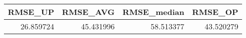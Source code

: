 \begin{tabular}{rrrr}
\toprule
  RMSE\_UP &  RMSE\_AVG &  RMSE\_median &   RMSE\_OP \\
\midrule
26.859724 & 45.431996 &    58.513377 & 43.520279 \\
\bottomrule
\end{tabular}
